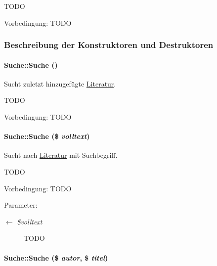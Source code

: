 TODO \begin{Desc}
\item[Vorbedingung:]TODO \end{Desc}




\subsubsection{Beschreibung der Konstruktoren und Destruktoren}
\hypertarget{classSuche_e863aff1c9abcb0308d5d3fdcdebb968}{
\paragraph[Suche]{\setlength{\rightskip}{0pt plus 5cm}Suche::Suche ()}\hfill}
\label{classSuche_e863aff1c9abcb0308d5d3fdcdebb968}


Sucht zuletzt hinzugefügte \hyperlink{classLiteratur}{Literatur}. 

TODO \begin{Desc}
\item[Vorbedingung:]TODO \end{Desc}
\hypertarget{classSuche_05639fec18bd3193c01aafb08208ec94}{
\paragraph[Suche]{\setlength{\rightskip}{0pt plus 5cm}Suche::Suche (\$ {\em volltext})}\hfill}
\label{classSuche_05639fec18bd3193c01aafb08208ec94}


Sucht nach \hyperlink{classLiteratur}{Literatur} mit Suchbegriff. 

TODO \begin{Desc}
\item[Vorbedingung:]TODO \end{Desc}
\begin{Desc}
\item[Parameter:]
\begin{description}
\item[\mbox{$\leftarrow$} {\em \$volltext}]TODO \end{description}
\end{Desc}
\hypertarget{classSuche_4158769424a462492ac7821a0a30cf08}{
\paragraph[Suche]{\setlength{\rightskip}{0pt plus 5cm}Suche::Suche (\$ {\em autor}, \$ {\em titel})}\hfill}
\label{classSuche_4158769424a462492ac7821a0a30cf08}


